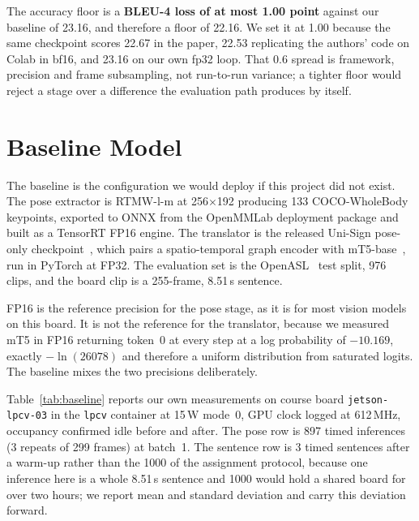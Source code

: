 \documentclass[conference]{IEEEtran}
\begin{document}
The accuracy floor is a \textbf{BLEU-4 loss of at most 1.00 point} against our
baseline of 23.16, and therefore a floor of 22.16. We set it at 1.00 because the same
checkpoint scores 22.67 in the paper, 22.53 replicating the authors' code on Colab in
bf16, and 23.16 on our own fp32 loop. That 0.6 spread is framework, precision and
frame subsampling, not run-to-run variance; a tighter floor would reject a stage over
a difference the evaluation path produces by itself.

\section{Baseline Model}

The baseline is the configuration we would deploy if this project did not exist. The
pose extractor is RTMW-l-m at 256$\times$192 producing 133 COCO-WholeBody keypoints,
exported to ONNX from the OpenMMLab deployment package and built as a TensorRT FP16
engine. The translator is the released Uni-Sign pose-only checkpoint~\cite{unisign},
which pairs a spatio-temporal graph encoder with mT5-base~\cite{mt5}, run in PyTorch
at FP32. The evaluation set is the OpenASL~\cite{openasl} test split, 976 clips, and
the board clip is a 255-frame, 8.51\,s sentence.

FP16 is the reference precision for the pose stage, as it is for most vision models on
this board. It is not the reference for the translator, because we measured mT5 in
FP16 returning token~0 at every step at a log probability of $-10.169$, exactly
$-\ln(26078)$ and therefore a uniform distribution from saturated logits. The baseline
mixes the two precisions deliberately.

Table~\ref{tab:baseline} reports our own measurements on course board
\texttt{jetson-lpcv-03} in the \texttt{lpcv} container at 15\,W mode~0, GPU clock
logged at 612\,MHz, occupancy confirmed idle before and after. The pose row is 897
timed inferences (3 repeats of 299 frames) at batch~1. The sentence row is 3 timed
sentences after a warm-up rather than the 1000 of the assignment protocol, because one
inference here is a whole 8.51\,s sentence and 1000 would hold a shared board for over
two hours; we report mean and standard deviation and carry this deviation forward.
\end{document}
